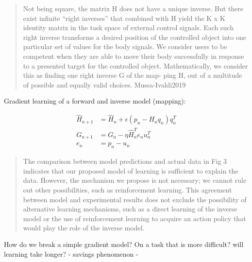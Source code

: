 \documentclass[../main.tex]{subfiles}
\begin{document}
\begin{quote}
Not being square, the matrix H does not have a unique inverse. But there exist infinite ``right inverses'' that combined with H yield the K x K identity matrix in the task space of external control signals. Each such right inverse transforms a desired position of the controlled object into one particular set of values for the body signals. We consider users to be competent when they are able to move their body successfully in response to a presented target for the controlled object. Mathematically, we consider this as finding one right inverse G of the map- ping H, out of a multitude of possible and equally valid choices. Mussa-Ivaldi2019
\end{quote}

Gradient learning of a forward and inverse model (mapping):

\begin{align*}
    \hat{H}_{n+1} &= \hat{H}_n + \epsilon(p_n - H_nq_n)q_n^T  \\
    G_{n+1} &= G_n - \eta\hat{H}_n^Te_nu_n^T \\
    e_n &= p_n - u_n
\end{align*}

\begin{quote}
The comparison between model predictions and actual data in Fig 3 indicates that our proposed model of learning is sufficient to explain the data. However, the mechanism we propose is not necessary; we cannot rule out other possibilities, such as reinforcement learning. \cite{}   This agreement between model and experimental results does not exclude the possibility of alternative learning mechanisms, such as a direct learning of the inverse model \cite{Mussa-Ivaldi2019} or the use of reinforcement learning \cite{Mussa-Ivaldi2019} to acquire an action policy that would play the role of the inverse model. 
\end{quote}

How do we break a simple gradient model? On a task that is more difficult? will learning take longer? - savings phenomenon -
\end{document}
